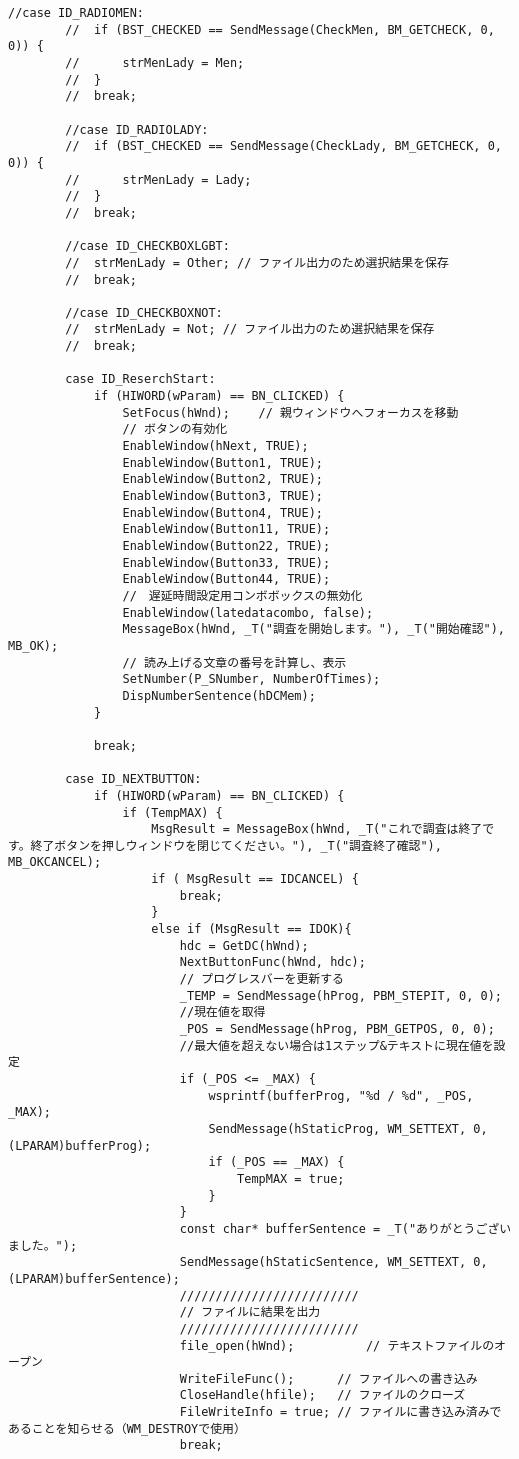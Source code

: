 \begin{lstlisting}[caption=main.cpp]
		//case ID_RADIOMEN:
		//	if (BST_CHECKED == SendMessage(CheckMen, BM_GETCHECK, 0, 0)) {
		//		strMenLady = Men;
		//	}
		//	break;
	
		//case ID_RADIOLADY:
		//	if (BST_CHECKED == SendMessage(CheckLady, BM_GETCHECK, 0, 0)) {
		//		strMenLady = Lady; 
		//	}
		//	break;
	
		//case ID_CHECKBOXLGBT:
		//	strMenLady = Other; // ファイル出力のため選択結果を保存
		//	break;
	
		//case ID_CHECKBOXNOT:
		//	strMenLady = Not; // ファイル出力のため選択結果を保存
		//	break;
	
		case ID_ReserchStart:
			if (HIWORD(wParam) == BN_CLICKED) {
				SetFocus(hWnd);    // 親ウィンドウへフォーカスを移動
				// ボタンの有効化
				EnableWindow(hNext, TRUE);
				EnableWindow(Button1, TRUE);
				EnableWindow(Button2, TRUE);
				EnableWindow(Button3, TRUE);
				EnableWindow(Button4, TRUE);
				EnableWindow(Button11, TRUE);
				EnableWindow(Button22, TRUE);
				EnableWindow(Button33, TRUE);
				EnableWindow(Button44, TRUE);
				//　遅延時間設定用コンボボックスの無効化
				EnableWindow(latedatacombo, false);
				MessageBox(hWnd, _T("調査を開始します。"), _T("開始確認"), MB_OK);
				// 読み上げる文章の番号を計算し、表示
				SetNumber(P_SNumber, NumberOfTimes);
				DispNumberSentence(hDCMem);
			}
			
			break;
			
		case ID_NEXTBUTTON:
			if (HIWORD(wParam) == BN_CLICKED) {
				if (TempMAX) {
					MsgResult = MessageBox(hWnd, _T("これで調査は終了です。終了ボタンを押しウィンドウを閉じてください。"), _T("調査終了確認"), MB_OKCANCEL);
					if ( MsgResult == IDCANCEL) {
						break;
					}
					else if (MsgResult == IDOK){
						hdc = GetDC(hWnd);
						NextButtonFunc(hWnd, hdc);
						// プログレスバーを更新する
						_TEMP = SendMessage(hProg, PBM_STEPIT, 0, 0);
						//現在値を取得
						_POS = SendMessage(hProg, PBM_GETPOS, 0, 0);
						//最大値を超えない場合は1ステップ&テキストに現在値を設定
						if (_POS <= _MAX) {
							wsprintf(bufferProg, "%d / %d", _POS, _MAX);
							SendMessage(hStaticProg, WM_SETTEXT, 0, (LPARAM)bufferProg);
							if (_POS == _MAX) {
								TempMAX = true;
							}
						}
						const char* bufferSentence = _T("ありがとうございました。");
						SendMessage(hStaticSentence, WM_SETTEXT, 0, (LPARAM)bufferSentence);
						/////////////////////////
						// ファイルに結果を出力
						/////////////////////////
						file_open(hWnd);          // テキストファイルのオープン
						WriteFileFunc();      // ファイルへの書き込み
						CloseHandle(hfile);   // ファイルのクローズ
						FileWriteInfo = true; // ファイルに書き込み済みであることを知らせる（WM_DESTROYで使用）
						break;
						

\end{lstlisting}
